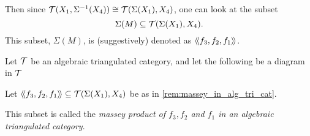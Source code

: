 \begin{remark}
    Then since \( {\mathcal{T}}(X_1, \Sigma^{-1}(X_4)) \cong {\mathcal{T}}(\Sigma(X_1), X_4) \), one can look at the subset
    \[
        \Sigma(M) \subseteq {\mathcal{T}}(\Sigma(X_1), X_4).
    \]
    This subset, \( \Sigma(M) \), is (suggestively) denoted as \( \langle \! \langle f_3, f_2, f_1\rangle \! \rangle \).
\end{remark}

\begin{definition}
    Let \( {\mathcal{T}} \) be an algebraic triangulated category, and let the following be a diagram in \( {\mathcal{T}} \)
    \begin{center}
    \end{center}
    Let \( \langle \! \langle f_3, f_2, f_1\rangle \! \rangle \subseteq {\mathcal{T}}(\Sigma(X_1), X_4) \) be as in \autoref{rem:massey_in_alg_tri_cat}.

    This subset is called the \emph{massey product of \( f_3, f_2 \) and \( f_1 \) in an algebraic triangulated category}.
\end{definition}




